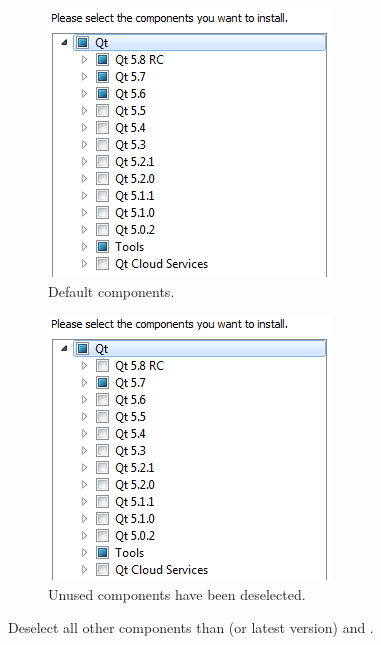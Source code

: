 \begin{figure} [h] %
\centering
\begin{subfigure}{.5\textwidth}
  \centering
  \includegraphics[width=.9\textwidth]{graphics/qt-setup-win-1.png}
  \caption{Default components.}
\end{subfigure}%
\begin{subfigure}{.5\textwidth}
  \centering
  \includegraphics[width=.9\textwidth]{graphics/qt-setup-win-2.png}
  \caption{Unused components have been deselected.}
\end{subfigure}%
\caption{Deselect all other components than  (or latest version) and .}
\label{fig:qt-setup-win-1}
\end{figure}


